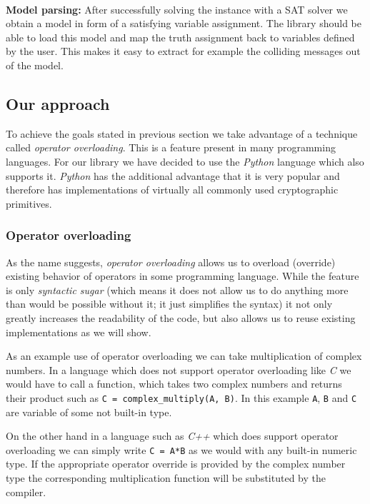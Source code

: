 ~\\
\textbf{Model parsing:}
After successfully solving the instance with a SAT solver we obtain a model in form of a satisfying variable assignment.
The library should be able to load this model and map the truth assignment back to variables defined by the user.
This makes it easy to extract for example the colliding messages out of the model.


\subsection{Our approach}
To achieve the goals stated in previous section we take advantage of a technique called \emph{operator overloading}.
This is a feature present in many programming languages.
For our library we have decided to use the \emph{Python} language which also supports it.
\emph{Python} has the additional advantage that it is very popular and therefore has implementations of virtually all commonly used cryptographic primitives.

\subsubsection{Operator overloading}
\label{sec:operator-overloading}
As the name suggests, \emph{operator overloading} allows us to overload (override) existing behavior of operators in some programming language.
While the feature is only \emph{syntactic sugar} (which means it does not allow us to do anything more than would be possible without it; it just simplifies the syntax) it not only greatly increases the readability of the code, but also allows us to reuse existing implementations as we will show.

As an example use of operator overloading we can take multiplication of complex numbers.
In a language which does not support operator overloading like \emph{C} we would have to call a function, which takes two complex numbers and returns their product such as \texttt{C = complex\_multiply(A, B)}.
In this example \texttt{A}, \texttt{B} and \texttt{C} are variable of some not built-in type.

On the other hand in a language such as \emph{C++} which does support operator overloading we can simply write \texttt{C = A*B} as we would with any built-in numeric type.
If the appropriate operator override is provided by the complex number type the corresponding multiplication function will be substituted by the compiler.

